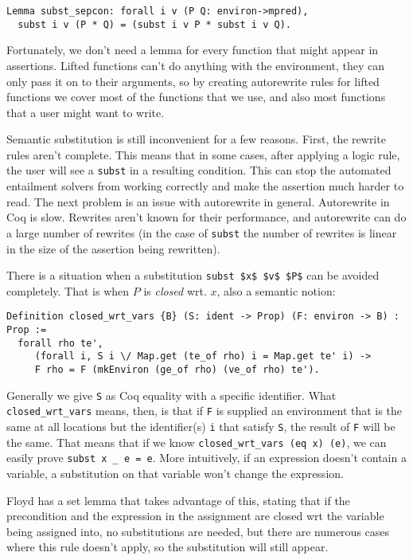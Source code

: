 \documentclass{puthesis}
\begin{document}
\begin{lstlisting}
Lemma subst_sepcon: forall i v (P Q: environ->mpred),
  subst i v (P * Q) = (subst i v P * subst i v Q).
\end{lstlisting}

Fortunately, we don't need a lemma for every function that might
appear in assertions. Lifted functions can't do anything with the
environment, they can only pass it on to their arguments, so
by creating autorewrite rules for lifted functions we cover
most of the functions that we use, and also most functions
that a user might want to write. 

Semantic substitution is still inconvenient for a few reasons. First,
the rewrite rules aren't complete. This means that in some cases, after
applying a logic rule, the user will see a \lstinline|subst| in a
resulting condition. This can stop the automated entailment
solvers from working correctly and make the assertion much harder
to read. The next problem is an issue with autorewrite in general.
Autorewrite in Coq is slow. Rewrites aren't known for their 
performance, and autorewrite can do a large number of rewrites
(in the case of \lstinline|subst| the number of rewrites is
linear in the size of the assertion being rewritten). 

There is a situation when a substitution \lstinline|subst $x$ $v$ $P$| can
be avoided completely. That is when $P$ is \emph{closed} wrt. 
$x$, also a semantic notion:

\begin{lstlisting}
Definition closed_wrt_vars {B} (S: ident -> Prop) (F: environ -> B) : Prop := 
  forall rho te',  
     (forall i, S i \/ Map.get (te_of rho) i = Map.get te' i) ->
     F rho = F (mkEnviron (ge_of rho) (ve_of rho) te').
\end{lstlisting}

Generally we give \lstinline|S| as Coq equality with a specific identifier. 
What \lstinline|closed_wrt_vars| means, then, is that if \lstinline|F|
is supplied an environment that is the same at all locations but 
the identifier(s) \lstinline|i| that satisfy \lstinline|S|, the
result of \lstinline|F| will be the same. That means that if we know
\lstinline|closed_wrt_vars (eq x) (e)|, we can easily prove
\lstinline|subst x _ e = e|. More intuitively, if an expression
doesn't contain a variable, a substitution on that variable
won't change the expression. 

Floyd has a set lemma that takes advantage of this, stating that if
the precondition and the expression in the assignment
are closed wrt the variable being assigned into, no substitutions are
needed, but there are numerous cases where this rule doesn't apply, 
so the substitution will still appear. 
\end{document}
